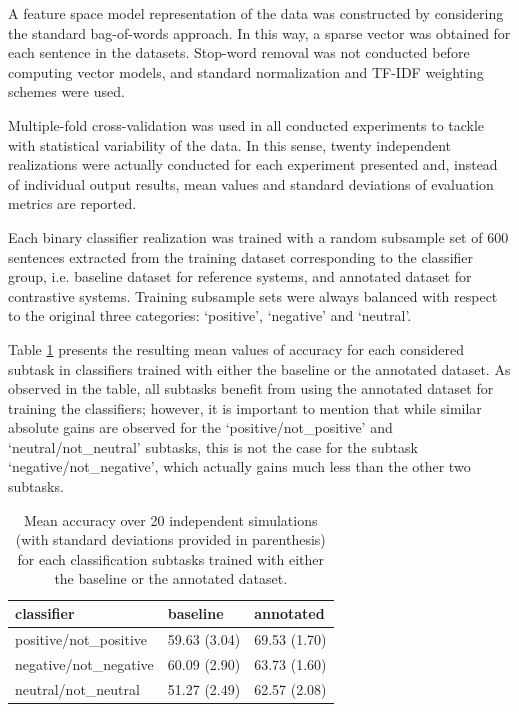 \documentclass[11pt,letterpaper]{article}
\begin{document}
A feature space model representation of the data was constructed by considering the standard bag-of-words approach. 
In this way, a sparse vector was obtained for each sentence in the datasets. Stop-word removal was not
conducted before computing vector models, and standard normalization and TF-IDF weighting schemes were used.

Multiple-fold cross-validation was used in all conducted experiments to tackle with statistical variability of the 
data. In this sense, twenty independent realizations were actually conducted for each experiment presented and,
instead of individual output results, mean values and standard deviations of evaluation metrics are reported.

Each binary classifier realization was trained with a random subsample set of 600 sentences extracted from 
the training dataset corresponding to the classifier group, i.e. baseline dataset for reference systems, 
and annotated dataset for contrastive systems. Training subsample sets were always balanced with respect to 
the original three categories: `positive', `negative' and `neutral'.


Table \ref{tc_accu} presents the resulting mean values of accuracy for each considered subtask 
in classifiers trained with either the baseline or the annotated dataset. As observed in the table,
all subtasks benefit from using the annotated dataset for training the classifiers; however, it is 
important to mention that while similar absolute gains are observed for the `positive/not\_positive' 
and `neutral/not\_neutral' subtasks, this is not the case for the subtask `negative/not\_negative', 
which actually gains much less than the other two subtasks.

\begin{table}
\begin{small}
\begin{tabular}{|l|l|l|}
\hline
classifier &baseline &annotated \\ 
\hline
positive/not\_positive &59.63 (3.04) &69.53 (1.70) \\ 
\hline
negative/not\_negative &60.09 (2.90) &63.73 (1.60) \\ 
\hline
neutral/not\_neutral &51.27 (2.49) &62.57 (2.08) \\ 
\hline
\end{tabular}
\end{small}
\caption{Mean accuracy over 20 independent simulations (with standard deviations provided in parenthesis) 
for each classification subtasks trained with either the baseline or the annotated dataset.}
\label{tc_accu}
\end{table}
\end{document}

